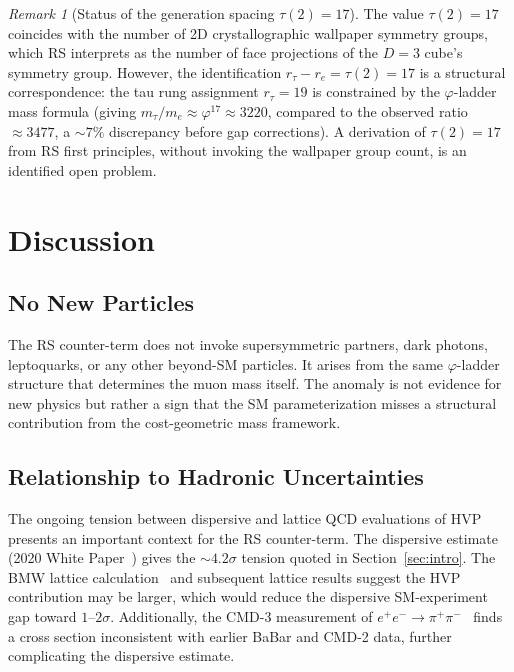 \documentclass[12pt,a4paper]{article}
\theoremstyle{definition}
\theoremstyle{remark}
\newtheorem{remark}[theorem]{Remark}
\begin{document}
\begin{remark}[Status of the generation spacing $\tau(2) = 17$]
The value $\tau(2) = 17$ coincides with the number of 2D crystallographic
wallpaper symmetry groups, which RS interprets as the number of face
projections of the $D=3$ cube's symmetry group.  However, the
identification $r_\tau - r_e = \tau(2) = 17$ is a structural
correspondence: the tau rung assignment $r_\tau = 19$ is constrained by
the $\varphi$-ladder mass formula (giving $m_\tau/m_e \approx \varphi^{17}
\approx 3220$, compared to the observed ratio $\approx 3477$, a $\sim 7\%$
discrepancy before gap corrections).  A derivation of $\tau(2) = 17$ from
RS first principles, without invoking the wallpaper group count, is an
identified open problem.
\end{remark}

\section{Discussion}
\label{sec:discuss}

\subsection{No New Particles}

The RS counter-term does not invoke supersymmetric partners, dark photons,
leptoquarks, or any other beyond-SM particles.  It arises from the same
$\varphi$-ladder structure that determines the muon mass itself.  The
anomaly is not evidence for new physics but rather a sign that the SM
parameterization misses a structural contribution from the cost-geometric
mass framework.

\subsection{Relationship to Hadronic Uncertainties}

The ongoing tension between dispersive and lattice QCD evaluations of HVP
presents an important context for the RS counter-term.  The dispersive
estimate (2020 White Paper~\cite{WhitePaper2020}) gives the $\sim 4.2\sigma$
tension quoted in Section~\ref{sec:intro}.  The BMW lattice calculation~\cite{BMW2021}
and subsequent lattice results suggest the HVP contribution may be larger,
which would reduce the dispersive SM-experiment gap toward $1$--$2\sigma$.
Additionally, the CMD-3 measurement of $e^+e^- \to \pi^+\pi^-$~\cite{CMD3_2023}
finds a cross section inconsistent with earlier BaBar and CMD-2 data,
further complicating the dispersive estimate.
\end{document}

